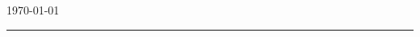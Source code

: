 \begin{titlepage}

\vspace*{1cm}

\noindent
{\textcolor{apuntes}{\titlefont \printtitle{}}}\par

\vspace*{0.5cm}

\epigraph{\resumen}{\today}
\null\vfill
\vspace*{1cm}
\noindent
\hfill
\begin{minipage}{0.39\linewidth}
    \begin{flushright}
        \printauthor
    \end{flushright}
\end{minipage}
%
\begin{minipage}{0.02\linewidth}
\null
\end{minipage}
\begin{minipage}{0.02\linewidth}
    \rule{1pt}{125pt}
\end{minipage}
\titlepagedecoration


\hfill

\end{titlepage}